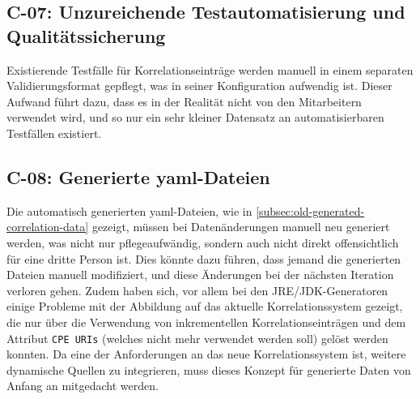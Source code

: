 \subsection{C-07: Unzureichende Testautomatisierung und Qualitätssicherung}\label{subsec:c-07-test-framework}


Existierende Testfälle für Korrelationseinträge werden manuell in einem separaten Validierungsformat gepflegt, was in seiner Konfiguration aufwendig ist.
Dieser Aufwand führt dazu, dass es in der Realität nicht von den Mitarbeitern verwendet wird, und so nur ein sehr kleiner Datensatz an automatisierbaren Testfällen existiert.

\subsection{C-08: Generierte \acrshort{yaml}-Dateien}\label{subsec:c-08-generated-correlation-data}


Die automatisch generierten \acrshort{yaml}-Dateien, wie in \autoref{subsec:old-generated-correlation-data} gezeigt, müssen bei Datenänderungen manuell neu generiert werden, was nicht nur pflegeaufwändig, sondern auch nicht direkt offensichtlich für eine dritte Person ist.
Dies könnte dazu führen, dass jemand die generierten Dateien manuell modifiziert, und diese Änderungen bei der nächsten Iteration verloren gehen.
Zudem haben sich, vor allem bei den JRE/JDK-Generatoren einige Probleme mit der Abbildung auf das aktuelle Korrelationssystem gezeigt, die nur über die Verwendung von inkrementellen Korrelationseinträgen und dem Attribut \texttt{CPE URIs} (welches nicht mehr verwendet werden soll) gelöst werden konnten.
Da eine der Anforderungen an das neue Korrelationssystem ist, weitere dynamische Quellen zu integrieren, muss dieses Konzept für generierte Daten von Anfang an mitgedacht werden.

